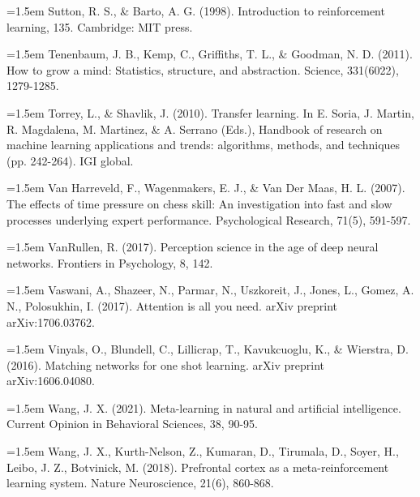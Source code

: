 \hangindent=1.5em
Sutton, R. S., \& Barto, A. G. (1998).
Introduction to reinforcement learning, 135.
Cambridge: MIT press.
\par

\hangindent=1.5em
Tenenbaum, J. B., Kemp, C., Griffiths, T. L., \& Goodman, N. D.
(2011).
How to grow a mind: Statistics, structure, and abstraction.
Science, 331(6022), 1279-1285.
\par

\hangindent=1.5em
Torrey, L., \& Shavlik, J. (2010).
Transfer learning.
In E. Soria, J. Martin, R. Magdalena, M. Martinez,
\& A. Serrano (Eds.),
Handbook of research on machine learning applications and trends:
algorithms, methods, and techniques (pp. 242-264).
IGI global.
\par

\hangindent=1.5em
Van Harreveld, F., Wagenmakers, E. J., \& Van Der Maas, H. L.
(2007).
The effects of time pressure on chess skill:
An investigation into fast and slow processes underlying
expert performance.
Psychological Research, 71(5), 591-597.
\par

\hangindent=1.5em
VanRullen, R. (2017).
Perception science in the age of deep neural networks.
Frontiers in Psychology, 8, 142.
\par

\hangindent=1.5em
Vaswani, A., Shazeer, N., Parmar, N., Uszkoreit, J.,
Jones, L., Gomez, A. N., Polosukhin, I. (2017).
Attention is all you need.
arXiv preprint arXiv:1706.03762.
\par

\hangindent=1.5em
Vinyals, O., Blundell, C., Lillicrap, T., Kavukcuoglu, K.,
\& Wierstra, D. (2016).
Matching networks for one shot learning.
arXiv preprint arXiv:1606.04080.
\par

\hangindent=1.5em
Wang, J. X. (2021).
Meta-learning in natural and artificial intelligence.
Current Opinion in Behavioral Sciences, 38, 90-95.
\par

\hangindent=1.5em
Wang, J. X., Kurth-Nelson, Z., Kumaran, D., Tirumala, D.,
Soyer, H., Leibo, J. Z., Botvinick, M. (2018).
Prefrontal cortex as a meta-reinforcement learning system.
Nature Neuroscience, 21(6), 860-868.
\par

